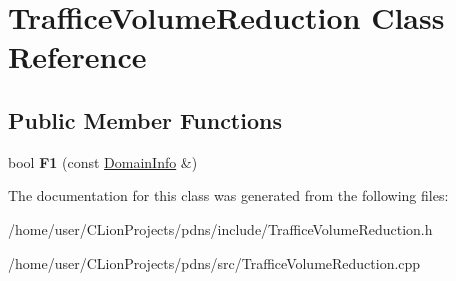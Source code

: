 \hypertarget{classTrafficeVolumeReduction}{}\section{Traffice\+Volume\+Reduction Class Reference}
\label{classTrafficeVolumeReduction}
\subsection*{Public Member Functions}
\begin{DoxyCompactItemize}
\item 
\mbox{\label{classTrafficeVolumeReduction_a28be7f871735706ebc60e8792812e91f}} 
bool {\bfseries F1} (const \hyperlink{structDomainInfo}{Domain\+Info} \&)
\end{DoxyCompactItemize}


The documentation for this class was generated from the following files\+:\begin{DoxyCompactItemize}
\item 
/home/user/\+C\+Lion\+Projects/pdns/include/Traffice\+Volume\+Reduction.\+h\item 
/home/user/\+C\+Lion\+Projects/pdns/src/Traffice\+Volume\+Reduction.\+cpp\end{DoxyCompactItemize}

